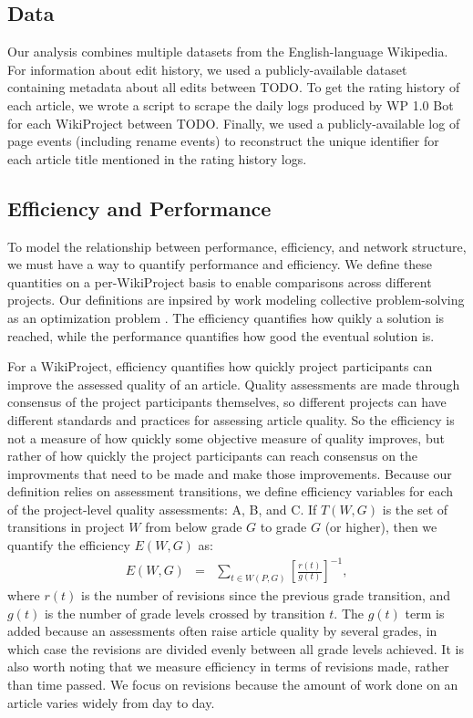 \documentclass[10pt,twocolumn]{article}
\newcommand{\beq}{\begin{eqnarray}}
\newcommand{\eeq}{\end{eqnarray}}
\newcommand{\+}{\phantom{-}}
\begin{document}
\subsection{Data}

Our analysis combines multiple datasets from the English-language Wikipedia.
For information about edit history, we used a publicly-available dataset containing
metadata about all edits between TODO.
To get the rating history of each article,
we wrote a script to scrape the daily logs produced by WP 1.0 Bot for each WikiProject
between TODO.
Finally, we used a publicly-available log of page events (including rename events)
to reconstruct the unique identifier for each article title mentioned in the rating history logs.

\subsection{Efficiency and Performance}

To model the relationship between performance, efficiency, and network structure,
we must have a way to quantify performance and efficiency.
We define these quantities on a per-WikiProject basis to enable comparisons across different
projects.
Our definitions are inpsired by work modeling collective problem-solving as an optimization
problem \cite{lazer_network_2007, mason_propagation_2008, mason_collaborative_2012,
grim_scientific_2013, barkoczi_social_2016}.
The efficiency quantifies how quikly a solution is reached,
while the performance quantifies how good the eventual solution is.

For a WikiProject, efficiency quantifies how quickly project participants can improve the
assessed quality of an article.
Quality assessments are made through consensus of the project participants themselves,
so different projects can have different standards and practices for assessing article quality.
So the efficiency is not a measure of how quickly some objective measure of quality improves,
but rather of how quickly the project participants can reach consensus on the improvments that
need to be made and make those improvements.
Because our definition relies on assessment transitions, we define efficiency variables for
each of the project-level quality assessments: A, B, and C.
If $T(W,G)$ is the set of transitions in project $W$ from below grade $G$ to grade $G$ (or higher),
then we quantify the efficiency $E(W,G)$ as:
\beq
E(W,G) &=& \sum_{t \in W(P,G)} \left[ \frac{r(t)}{g(t)} \right]^{-1},
\eeq
where $r(t)$ is the number of revisions since the previous grade transition,
and $g(t)$ is the number of grade levels crossed by transition $t$.
The $g(t)$ term is added because an assessments often raise article quality by several
grades, in which case the revisions are divided evenly between all grade levels achieved.
It is also worth noting that we measure efficiency in terms of revisions made,
rather than time passed.
We focus on revisions because the amount of work done on an article varies widely from day to day.
\end{document}
